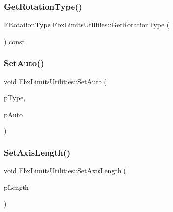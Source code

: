 \subsubsection{\texorpdfstring{Get\+Rotation\+Type()}{GetRotationType()}}
{\footnotesize\ttfamily \hyperlink{class_fbx_limits_utilities_a8c1ec432e195d91eae2548fbc98c8770}{E\+Rotation\+Type} Fbx\+Limits\+Utilities\+::\+Get\+Rotation\+Type (\begin{DoxyParamCaption}{ }\end{DoxyParamCaption}) const}

\mbox{\label{class_fbx_limits_utilities_a290ae79085beea63b37f3a9953e03709}} 
\subsubsection{\texorpdfstring{Set\+Auto()}{SetAuto()}}
{\footnotesize\ttfamily void Fbx\+Limits\+Utilities\+::\+Set\+Auto (\begin{DoxyParamCaption}\item[{\hyperlink{class_fbx_limits_utilities_aa55167751039b3d64b56cb7e58f2e62c}{E\+Type}}]{p\+Type,  }\item[{bool}]{p\+Auto }\end{DoxyParamCaption})}

\mbox{\label{class_fbx_limits_utilities_a0823e9206b2adba552e54811dfe11378}} 
\subsubsection{\texorpdfstring{Set\+Axis\+Length()}{SetAxisLength()}}
{\footnotesize\ttfamily void Fbx\+Limits\+Utilities\+::\+Set\+Axis\+Length (\begin{DoxyParamCaption}\item[{double}]{p\+Length }\end{DoxyParamCaption})}

\mbox{\label{class_fbx_limits_utilities_a89d6cb2e0dcdc0fc12f520a9b1ea9326}} 
